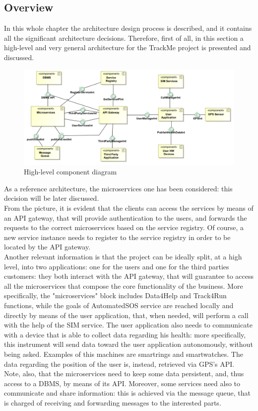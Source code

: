 \subsection{Overview}
In this whole chapter the architecture design process is described, and it contains all the significant
architecture decisions. 
Therefore, first of all, in this section a high-level and very general architecture for the TrackMe 
project is presented and discussed.  

\begin{figure}[H]
\includegraphics[width=\linewidth]{Images/highlevelcd.pdf}
\caption{ High-level component diagram }
\label{fig:highlevelcomponentdiagram}
\end{figure}

As a reference architecture, the microservices one has been considered: this decision will be later discussed. \\
From the picture, it is evident that the clients can access the services by means of an API gateway, that will provide authentication 
to the users, and forwards the requests to the correct microservices based on the service registry.
Of course, a new service instance needs to register to the service registry in order to be located by the API gateway. \\
Another relevant information is that the project can be ideally split, at a high level, into two applications: one for the users and one for the third parties customers: they both interact with the API gateway, that will guarantee to access all the
microservices that compose the core functionality of the business.
More specifically, the "microservices" block includes Data4Help and Track4Run functions, while the goals
of AutomatedSOS service are reached locally and directly by means of the user application, that, when
needed, will perform a call with the help of the SIM service. 
The user application also needs to communicate with a device that is able to collect data regarding his health: more specifically, this
instrument will send data toward the user application autonomously, without being asked.
Examples of  this machines are smartrings and smartwatches. 
The data regarding the position of the user is, instead, retrieved via GPS's API. \\
Note, also, that the microservices need to keep some data persistent, and, thus access to a DBMS, by means
of its API. 
Moreover, some services need also to communicate and share information: this is achieved via the message queue, that is
charged of receiving and forwarding messages to the interested parts. \\

